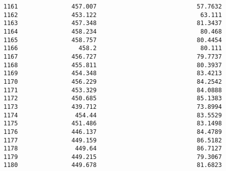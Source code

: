 \documentclass[11pt]{article}
\begin{document}
\begin{tcolorbox}[breakable, size=fbox, boxrule=.5pt, pad at break*=1mm, opacityfill=0]
\begin{Verbatim}[commandchars=\\\{\}]
1161               457.007                            57.7632
1162               453.122                             63.111
1163               457.348                            81.3437
1164               458.234                             80.468
1165               458.757                            80.4454
1166                 458.2                             80.111
1167               456.727                            79.7737
1168               455.811                            80.3937
1169               454.348                            83.4213
1170               456.229                            84.2542
1171               453.329                            84.0888
1172               450.685                            85.1383
1173               439.712                            73.8994
1174                454.44                            83.5529
1175               451.486                            83.1498
1176               446.137                            84.4789
1177               449.159                            86.5182
1178                449.64                            86.7127
1179               449.215                            79.3067
1180               449.678                            81.6823


\end{Verbatim}
\end{tcolorbox}
\end{document}
